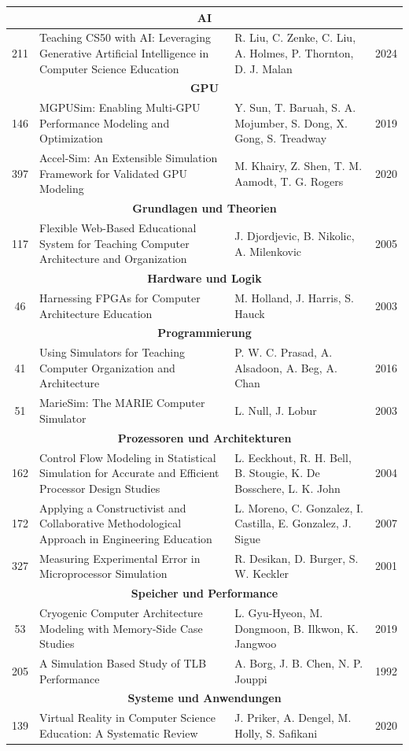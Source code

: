 {\begin{longtable}{|c|p{6cm}|p{3cm}|c|}
    \multicolumn{4}{c}{\textbf{AI}} \\
    \hline
    211 & Teaching CS50 with AI: Leveraging Generative Artificial Intelligence in Computer Science Education & R. Liu, C. Zenke, C. Liu, A. Holmes, P. Thornton, D. J. Malan & 2024 \\
    \hline
    \multicolumn{4}{c}{\textbf{GPU}} \\
    \hline
    146 & MGPUSim: Enabling Multi-GPU Performance Modeling and Optimization & Y. Sun, T. Baruah, S. A. Mojumber, S. Dong, X. Gong, S. Treadway & 2019 \\
    397 & Accel-Sim: An Extensible Simulation Framework for Validated GPU Modeling & M. Khairy, Z. Shen, T. M. Aamodt, T. G. Rogers & 2020 \\
    \hline
    \multicolumn{4}{c}{\textbf{Grundlagen und Theorien}} \\
    \hline
    117 & Flexible Web-Based Educational System for Teaching Computer Architecture and Organization & J. Djordjevic, B. Nikolic, A. Milenkovic & 2005 \\
    \hline
    \multicolumn{4}{c}{\textbf{Hardware und Logik}} \\
    \hline
    46 & Harnessing FPGAs for Computer Architecture Education & M. Holland, J. Harris, S. Hauck & 2003 \\
    \hline
    \multicolumn{4}{c}{\textbf{Programmierung}} \\
    \hline
    41 & Using Simulators for Teaching Computer Organization and Architecture & P. W. C. Prasad, A. Alsadoon, A. Beg, A. Chan & 2016 \\
    51 & MarieSim: The MARIE Computer Simulator & L. Null, J. Lobur & 2003 \\
    \hline
    \multicolumn{4}{c}{\textbf{Prozessoren und Architekturen}} \\
    \hline
    162 & Control Flow Modeling in Statistical Simulation for Accurate and Efficient Processor Design Studies & L. Eeckhout, R. H. Bell, B. Stougie, K. De Bosschere, L. K. John & 2004 \\
    172 & Applying a Constructivist and Collaborative Methodological Approach in Engineering Education & L. Moreno, C. Gonzalez, I. Castilla, E. Gonzalez, J. Sigue & 2007 \\
    327 & Measuring Experimental Error in Microprocessor Simulation & R. Desikan, D. Burger, S. W. Keckler & 2001 \\
    \hline
    \multicolumn{4}{c}{\textbf{Speicher und Performance}} \\
    \hline
    53 & Cryogenic Computer Architecture Modeling with Memory-Side Case Studies & L. Gyu-Hyeon, M. Dongmoon, B. Ilkwon, K. Jangwoo & 2019 \\
    205 & A Simulation Based Study of TLB Performance & A. Borg, J. B. Chen, N. P. Jouppi & 1992 \\
    \hline
    \multicolumn{4}{c}{\textbf{Systeme und Anwendungen}} \\
    \hline
    139 & Virtual Reality in Computer Science Education: A Systematic Review & J. Priker, A. Dengel, M. Holly, S. Safikani & 2020 \\
    \hline
\end{longtable}
}
